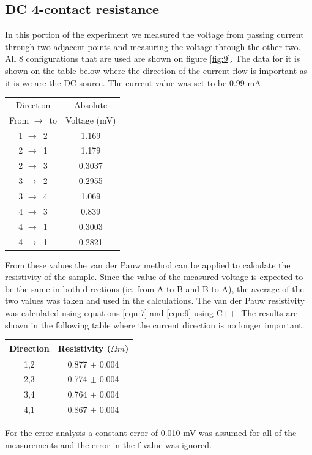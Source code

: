 \documentclass[twocolumn]{article}
\begin{document}
\subsection{DC 4-contact resistance}
In this portion of the experiment we measured the voltage from passing current 
through two adjacent points and measuring the voltage through the other two. 
All 8 configurations that are used are shown on figure \ref{fig:9}. 
The data for it is shown on the table below where the direction of the current 
flow is important as it is we are the DC source. The current value was set to 
be 0.99 mA.
\begin{minipage}{\linewidth}
\Centering
\begin{tabular}{|c|c|}
\hline
Direction & Absolute \\ From $\to\,$ to & Voltage (mV) \\ \hline
1 $\to\,$ 2 & 1.169 \\ \hline
2 $\to\,$ 1 & 1.179 \\ \hline
2 $\to\,$ 3 & 0.3037 \\ \hline
3 $\to\,$ 2 & 0.2955 \\ \hline
3 $\to\,$ 4 & 1.069 \\ \hline
4 $\to\,$ 3 & 0.839 \\ \hline
4 $\to\,$ 1 & 0.3003 \\ \hline
4 $\to\,$ 1 & 0.2821 \\ \hline
\end{tabular}
\label{tbl:4}
\end{minipage}
From these values the van der Pauw method can be applied to calculate the 
resistivity of the sample. Since the value of the measured voltage is expected 
to be the same in both directions (ie. from A to B and B to A), the average of 
the two values was taken and used in the calculations. The van der Pauw 
resistivity was calculated using equations \ref{eqn:7} and \ref{eqn:9} using 
C++. The results are shown in the following table where the current direction 
is no longer important.
\begin{minipage}{\linewidth}
\Centering
\begin{tabular}{|c|c|}
\hline
Direction & Resistivity ($\Omega m$) \\ \hline
1,2 & 0.877 $\pm$ 0.004 \\ \hline
2,3 & 0.774 $\pm$ 0.004 \\ \hline
3,4 & 0.764 $\pm$ 0.004 \\ \hline
4,1 & 0.867 $\pm$ 0.004 \\ \hline
\end{tabular}
\label{tbl:5}
\end{minipage}
For the error analysis a constant error of 0.010 mV was assumed for all of the 
measurements and the error in the f value was ignored.
\end{document}
